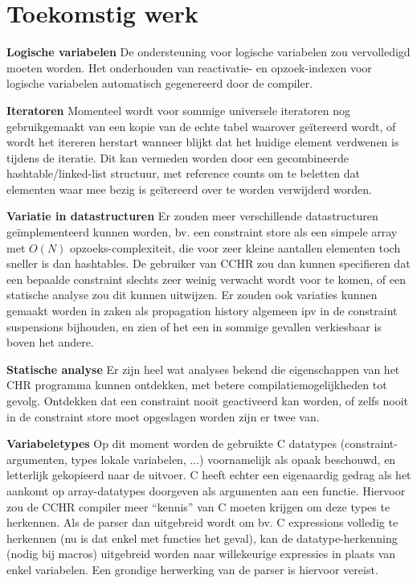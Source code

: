 \section{Toekomstig werk}

{\bf Logische variabelen} De ondersteuning voor logische variabelen zou vervolledigd moeten worden. Het onderhouden van reactivatie- en opzoek-indexen voor logische variabelen automatisch gegenereerd door de compiler.

{\bf Iteratoren} Momenteel wordt voor sommige universele iteratoren nog gebruikgemaakt van een kopie van de echte tabel waarover ge\"itereerd wordt, of wordt het itereren herstart wanneer blijkt dat het huidige element verdwenen is tijdens de iteratie. Dit kan vermeden worden door een gecombineerde hashtable/linked-list structuur, met reference counts om te beletten dat elementen waar mee bezig is ge\"itereerd over te worden verwijderd worden. 

{\bf Variatie in datastructuren} Er zouden meer verschillende datastructuren ge\"implementeerd kunnen worden, bv. een constraint store als een simpele array met $O(N)$ opzoeks-complexiteit, die voor zeer kleine aantallen elementen toch sneller is dan hashtables. De gebruiker van CCHR zou dan kunnen specifieren dat een bepaalde constraint slechts zeer weinig verwacht wordt voor te komen, of een statische analyse zou dit kunnen uitwijzen. Er zouden ook variaties kunnen gemaakt worden in zaken als propagation history algemeen ipv in de constraint suspensions bijhouden, en zien of het een in sommige gevallen verkiesbaar is boven het andere.

{\bf Statische analyse} Er zijn heel wat analyses bekend die eigenschappen van het CHR programma kunnen ontdekken, met betere compilatiemogelijkheden tot gevolg. Ontdekken dat een constraint nooit geactiveerd kan worden, of zelfs nooit in de constraint store moet opgeslagen worden zijn er twee van.

{\bf Variabeletypes} Op dit moment worden de gebruikte C datatypes (constraint-argumenten, types lokale variabelen, ...) voornamelijk als opaak beschouwd, en letterlijk gekopieerd naar de uitvoer. C heeft echter een eigenaardig gedrag als het aankomt op array-datatypes doorgeven als argumenten aan een functie. Hiervoor zou de CCHR compiler meer ``kennis'' van C moeten krijgen om deze types te herkennen. Als de parser dan uitgebreid wordt om bv. C expressions volledig te herkennen (nu is dat enkel met functies het geval), kan de datatype-herkenning (nodig bij macros) uitgebreid worden naar willekeurige expressies in plaats van enkel variabelen. Een grondige herwerking van de parser is hiervoor vereist.

